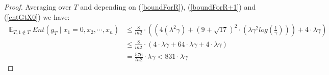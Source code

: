 \documentclass{article}
\begin{document}
\begin{proof}
				Averaging over $T$ and depending on (\ref{boundForR}), (\ref{boundForR+1}) and (\ref{entGtX0}) we have:
				\begin{equation} \label{final22} \begin{aligned}
					\mathop{\mathbb{E}}_{T, 1 \notin T} Ent \left( g_T \mid x_1 = 0,x_2, \cdots, x_n \right)
					& \leq \frac{8}{ln 2} \cdot \left( \left( 4 ( \lambda^2 \gamma ) + \left( 9 + \sqrt{17} \right)^2 \cdot \left( \lambda \gamma^2 log \left( \frac{1}{\gamma} \right) \right) \right)  + 4 \cdot \lambda \gamma \right) \\
					& \leq \frac{8}{ln 2} \cdot \left( 4 \cdot \lambda \gamma + 64 \cdot \lambda \gamma + 4 \cdot \lambda \gamma \right) \\
					& = \frac{576}{ln 2} \cdot \lambda \gamma < 831 \cdot \lambda \gamma
				\end{aligned}			
				\end{equation}
			\end{proof}
			
\end{document}
